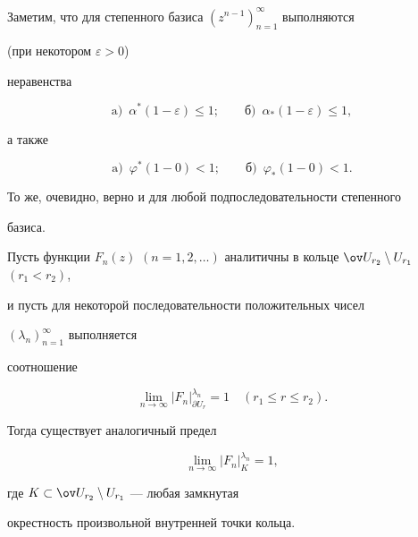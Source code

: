  


Заметим, что для степенного базиса $(z^{n-1})^\infty_{n=1}$ выполняются 


(при некотором $\varepsilon>0$) 


неравенства 


\begin{equation} 


\text{a)}\ \; \alpha^*(1-\varepsilon)\le1;\qquad 


\text{б)}\ \; \alpha_*(1-\varepsilon)\le1, 


\end{equation} 


а также 


\begin{equation} 


\text{a)}\ \; \varphi^*(1-0)<1;\qquad 


\text{б)}\ \; \varphi_*(1-0)<1. 


\end{equation} 


То же, очевидно, верно и для любой подпоследовательности степенного 


базиса. 


 


\begin{lem} 


Пусть функции $F_n(z)$ $(n=1,2,\dotsc)$ аналитичны в кольце $\ov 


U_{r_2}\setminus U_{r_1}$ $(r_1<r_2)$, 


и пусть для некоторой последовательности положительных чисел 


$(\lambda_n)^\infty_{n=1}$ выполняется 


соотношение 


\begin{equation} 


\lim_{n\to\infty}|F_n|^{\lambda_n}_{\partial U_r}=1\quad 


(r_1\le r\le r_2). 


\end{equation} 


Тогда существует аналогичный предел 


\begin{equation} 


\lim_{n\to\infty}|F_n|^{\lambda_n}_K=1, 


\end{equation} 


где $K\subset\ov U_{r_2}\setminus U_{r_1}$ --- любая замкнутая 


окрестность произвольной внутренней точки кольца. 


\end{lem} 


